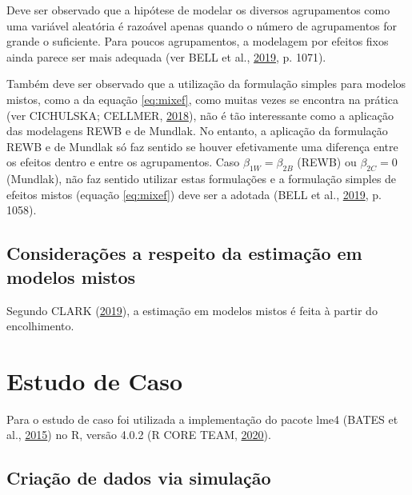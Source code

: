 \documentclass[
  a4paper, 12pt]{article}
\newcommand{\pkg}[1]{{\normalfont\fontseries{b}\selectfont #1}}
\let\proglang=\textsf
\begin{document}
Deve ser observado que a hipótese de modelar os diversos agrupamentos
como uma variável aleatória é razoável apenas quando o número de
agrupamentos for grande o suficiente. Para poucos agrupamentos, a
modelagem por efeitos fixos ainda parece ser mais adequada (ver BELL et
al., \protect\hyperlink{ref-bell2019}{2019}, p. 1071).

Também deve ser observado que a utilização da formulação simples para
modelos mistos, como a da equação \ref{eq:mixef}, como muitas vezes se
encontra na prática (ver CICHULSKA; CELLMER,
\protect\hyperlink{ref-polonia}{2018}), não é tão interessante como a
aplicação das modelagens REWB e de Mundlak. No entanto, a aplicação da
formulação REWB e de Mundlak só faz sentido se houver efetivamente uma
diferença entre os efeitos dentro e entre os agrupamentos. Caso
\(\beta_{1W} = \beta_{2B}\) (REWB) ou \(\beta_{2C} = 0\) (Mundlak), não
faz sentido utilizar estas formulações e a formulação simples de efeitos
mistos (equação \ref{eq:mixef}) deve ser a adotada (BELL et al.,
\protect\hyperlink{ref-bell2019}{2019}, p. 1058).

\hypertarget{considerauxe7uxf5es-a-respeito-da-estimauxe7uxe3o-em-modelos-mistos}{%
\subsection{Considerações a respeito da estimação em modelos
mistos}\label{considerauxe7uxf5es-a-respeito-da-estimauxe7uxe3o-em-modelos-mistos}}

Segundo CLARK (\protect\hyperlink{ref-clark2019shrinkage}{2019}), a
estimação em modelos mistos é feita à partir do encolhimento.

\hypertarget{estudo-de-caso}{%
\section{Estudo de Caso}\label{estudo-de-caso}}

Para o estudo de caso foi utilizada a implementação do pacote \pkg{lme4}
(BATES et al., \protect\hyperlink{ref-Bates}{2015}) no \proglang{R},
versão 4.0.2 (R CORE TEAM, \protect\hyperlink{ref-R}{2020}).

\hypertarget{criauxe7uxe3o-de-dados-via-simulauxe7uxe3o}{%
\subsection{Criação de dados via
simulação}\label{criauxe7uxe3o-de-dados-via-simulauxe7uxe3o}}
\end{document}
